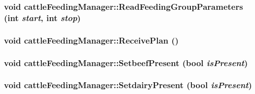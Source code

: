 \hypertarget{classcattle_feeding_manager_aa1204eac6b3850b06e7b5b1a0f54cacc}{
\subsubsection[{ReadFeedingGroupParameters}]{\setlength{\rightskip}{0pt plus 5cm}void cattleFeedingManager::ReadFeedingGroupParameters (int {\em start}, \/  int {\em stop})}}
\label{classcattle_feeding_manager_aa1204eac6b3850b06e7b5b1a0f54cacc}
\hypertarget{classcattle_feeding_manager_a2e4bb44d555d13f9ebb0b960517de172}{
\subsubsection[{ReceivePlan}]{\setlength{\rightskip}{0pt plus 5cm}void cattleFeedingManager::ReceivePlan ()}}
\label{classcattle_feeding_manager_a2e4bb44d555d13f9ebb0b960517de172}
\hypertarget{classcattle_feeding_manager_a14e418c33839dc6e08048cff98197cd5}{
\subsubsection[{SetbeefPresent}]{\setlength{\rightskip}{0pt plus 5cm}void cattleFeedingManager::SetbeefPresent (bool {\em isPresent})}}
\label{classcattle_feeding_manager_a14e418c33839dc6e08048cff98197cd5}
\hypertarget{classcattle_feeding_manager_a777a9ea05ff6bf97d301ebaea5661dc0}{
\subsubsection[{SetdairyPresent}]{\setlength{\rightskip}{0pt plus 5cm}void cattleFeedingManager::SetdairyPresent (bool {\em isPresent})}}

